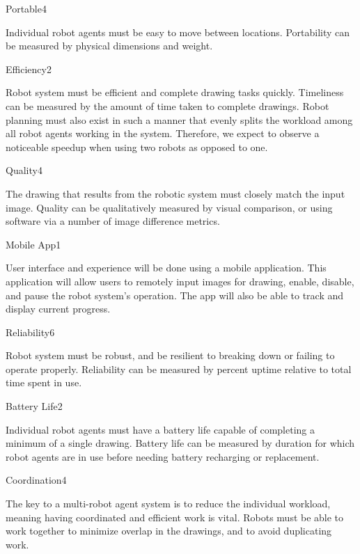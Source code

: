 \begin{nonfunctional_requirement}{Portable}{4}
\item Individual robot agents must be easy to move between locations. Portability can be measured by physical dimensions and weight.
\end{nonfunctional_requirement}

\begin{nonfunctional_requirement}{Efficiency}{2}
\item Robot system must be efficient and complete drawing tasks quickly. Timeliness can be measured by the amount of time taken to complete drawings. Robot planning must also exist in such a manner that evenly splits the workload among all robot agents working in the system. Therefore, we expect to observe a noticeable speedup when using two robots as opposed to one. 
\end{nonfunctional_requirement}

\begin{nonfunctional_requirement}{Quality}{4}
\item The drawing that results from the robotic system must closely match the input image. Quality can be qualitatively measured by visual comparison, or using software via a number of image difference metrics.
\end{nonfunctional_requirement}

\begin{nonfunctional_requirement}{Mobile App}{1}
\item User interface and experience will be done using a mobile application. This application will allow users to remotely input images for drawing, enable, disable, and pause the robot system's operation. The app will also be able to track and display current progress.
\end{nonfunctional_requirement}

\begin{nonfunctional_requirement}{Reliability}{6}
\item Robot system must be robust, and be resilient to breaking down or failing to operate properly. Reliability can be measured by percent uptime relative to total time spent in use.
\end{nonfunctional_requirement}

\begin{nonfunctional_requirement}{Battery Life}{2}
\item Individual robot agents must have a battery life capable of completing a minimum of a single drawing. Battery life can be measured by duration for which robot agents are in use before needing battery recharging or replacement.
\end{nonfunctional_requirement}

\begin{nonfunctional_requirement}{Coordination}{4}
\item The key to a multi-robot agent system is to reduce the individual workload, meaning having coordinated and efficient work is vital. Robots must be able to work together to minimize overlap in the drawings, and to avoid duplicating work.
\end{nonfunctional_requirement}

